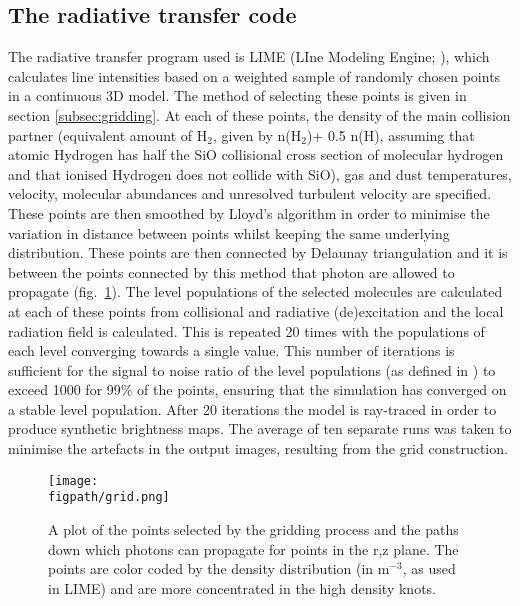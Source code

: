 \documentclass[useAMS,usenatbib,letters]{mn2e}
\newcommand{\figpath}{PFIGS/}
\begin{document}
\subsection{The radiative transfer code} \label{subsec:radiative_transfer_code}
The radiative transfer program used is LIME (LIne Modeling Engine; \citealt{Brinch:2010p13078}), which  calculates line intensities based on a weighted sample of randomly chosen points in a continuous 3D model. The method of selecting these points is given in section \ref{subsec:gridding}. At each of these points, the density of the main collision partner (equivalent amount of H$_2$, given by n(H$_2$)+ 0.5 n(H), assuming that atomic Hydrogen has half the SiO collisional cross section of molecular hydrogen and that ionised Hydrogen does not collide with SiO), gas and dust temperatures, velocity, molecular abundances and unresolved turbulent velocity are specified. These points are then smoothed by Lloyd's algorithm \citep{Lloyd1982} in order to minimise the variation in distance between points whilst keeping the same underlying distribution. These points are then connected by Delaunay triangulation and it is between the points connected by this method that photon are allowed to propagate (fig.~\ref{grid}). The level populations of the selected molecules are calculated at each of these points from collisional and radiative (de)excitation and the local radiation field is calculated. This is repeated 20 times with the populations of each level converging towards a single value. This number of iterations is sufficient for the signal to noise ratio of the level populations (as defined in \citealt{Brinch:2010p13078}) to exceed 1000 for 99\% of the points, ensuring that the simulation has converged on a stable level population. After 20 iterations the model is ray-traced in order to produce synthetic brightness maps. The average of ten separate runs was taken to minimise the artefacts in the output images, resulting from the grid construction.%


\begin{figure}
 \texttt{[image: \\figpath/grid.png]}
 \caption{A plot of the points selected by the gridding process and the paths down which photons can propagate for points in the r,z plane. The points are color coded by the density distribution (in m$^{-3}$, as used in LIME) and are more concentrated in the high density knots.}
\label{grid} %
\end{figure}
\end{document}
